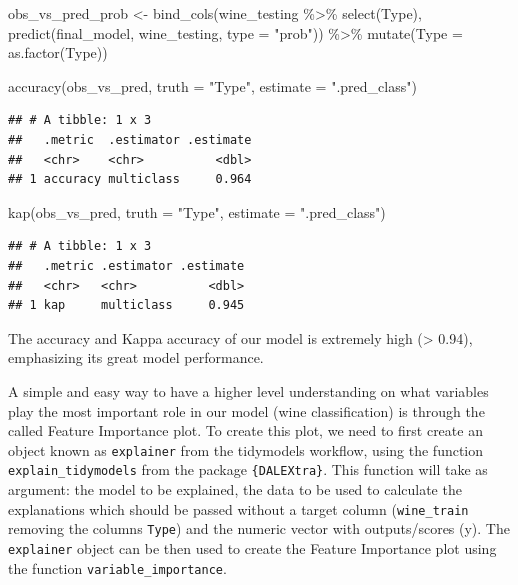 \documentclass[
]{krantz}
\makeatletter
\newenvironment{Shaded}{\begin{snugshade}}{\end{snugshade}}
\newcommand{\AttributeTok}[1]{\textcolor[rgb]{0.61,0.61,0.61}{#1}}
\newcommand{\FunctionTok}[1]{\textcolor[rgb]{0,0,0}{#1}}
\newcommand{\NormalTok}[1]{#1}
\newcommand{\OtherTok}[1]{\textcolor[rgb]{0.37,0.37,0.37}{#1}}
\newcommand{\SpecialCharTok}[1]{\textcolor[rgb]{0,0,0}{#1}}
\newcommand{\StringTok}[1]{\textcolor[rgb]{0.5,0.5,0.5}{#1}}
\newenvironment{kframe}{%
\medskip{}
\setlength{\fboxsep}{.8em}
 \def\at@end@of@kframe{}%
 \ifinner\ifhmode%
  \def\at@end@of@kframe{\end{minipage}}%
  \begin{minipage}{\columnwidth}%
 \fi\fi%
 \def\FrameCommand##1{\hskip\@totalleftmargin \hskip-\fboxsep
 \colorbox{shadecolor}{##1}\hskip-\fboxsep
     \hskip-\linewidth \hskip-\@totalleftmargin \hskip\columnwidth}%
 \MakeFramed {\advance\hsize-\width
   \@totalleftmargin\z@ \linewidth\hsize
   \@setminipage}}%
 {\par\unskip\endMakeFramed%
 \at@end@of@kframe}
\renewenvironment{Shaded}{\begin{kframe}}{\end{kframe}}
\makeatother
\begin{document}
\begin{Shaded}
\begin{Highlighting}[]
\NormalTok{obs\_vs\_pred\_prob }\OtherTok{\textless{}{-}} \FunctionTok{bind\_cols}\NormalTok{(wine\_testing }\SpecialCharTok{\%\textgreater{}\%} 
                                \FunctionTok{select}\NormalTok{(Type), }
                              \FunctionTok{predict}\NormalTok{(final\_model, }
\NormalTok{                                      wine\_testing, }
                                      \AttributeTok{type =} \StringTok{"prob"}\NormalTok{)) }\SpecialCharTok{\%\textgreater{}\%} 
  \FunctionTok{mutate}\NormalTok{(}\AttributeTok{Type =} \FunctionTok{as.factor}\NormalTok{(Type))}

\FunctionTok{accuracy}\NormalTok{(obs\_vs\_pred, }\AttributeTok{truth =} \StringTok{"Type"}\NormalTok{, }\AttributeTok{estimate =} \StringTok{".pred\_class"}\NormalTok{)}
\end{Highlighting}
\end{Shaded}

\begin{verbatim}
## # A tibble: 1 x 3
##   .metric  .estimator .estimate
##   <chr>    <chr>          <dbl>
## 1 accuracy multiclass     0.964
\end{verbatim}

\begin{Shaded}
\begin{Highlighting}[]
\FunctionTok{kap}\NormalTok{(obs\_vs\_pred, }\AttributeTok{truth =} \StringTok{"Type"}\NormalTok{, }\AttributeTok{estimate =} \StringTok{".pred\_class"}\NormalTok{)}
\end{Highlighting}
\end{Shaded}

\begin{verbatim}
## # A tibble: 1 x 3
##   .metric .estimator .estimate
##   <chr>   <chr>          <dbl>
## 1 kap     multiclass     0.945
\end{verbatim}

The accuracy and Kappa accuracy of our model is extremely high (\textgreater{} 0.94), emphasizing its great model performance.

A simple and easy way to have a higher level understanding on what variables play the most important role in our model (wine classification) is through the called Feature Importance plot. To create this plot, we need to first create an object known as \texttt{explainer} from the tidymodels workflow, using the function \texttt{explain\_tidymodels} from the package \texttt{\{DALEXtra\}}. This function will take as argument: the model to be explained, the data to be used to calculate the explanations which should be passed without a target column (\texttt{wine\_train} removing the columns \texttt{Type}) and the numeric vector with outputs/scores (y). The \texttt{explainer} object can be then used to create the Feature Importance plot using the function \texttt{variable\_importance}.
\end{document}
